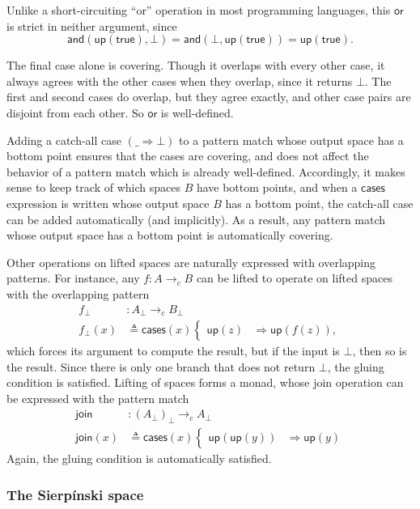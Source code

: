 \documentclass[conference]{IEEEtran}
\newcommand{\cto}{\to_c}
\newcommand{\wildcard}{\_}
\newcommand{\Branch}{\Rightarrow}
\newcommand{\up}{\mathsf{up}}
\begin{document}
Unlike a short-circuiting ``or'' operation in most programming languages, this $\mathsf{or}$ is strict in neither argument, since
\[ 
\mathsf{and}(\mathsf{up}(\mathsf{true}), \bot) = 
\mathsf{and}(\bot, \mathsf{up}(\mathsf{true})) =
\mathsf{up}(\mathsf{true}).
\]

The final case alone is covering. Though it overlaps with every other case, it always agrees with the other cases when they overlap, since it returns $\bot$. The first and second cases do overlap, but they agree exactly, and other case pairs are disjoint from each other. So $\mathsf{or}$ is well-defined.

Adding a catch-all case $(\wildcard \Branch \bot)$ to a pattern match whose output space has a bottom point ensures that the cases are covering, and does not affect the behavior of a pattern match which is already well-defined. Accordingly, it makes sense to keep track of which spaces $B$ have bottom points, and when a $\mathsf{cases}$ expression is written whose output space $B$ has a bottom point, the catch-all case can be added automatically (and implicitly). As a result, any pattern match whose output space has a bottom point is automatically covering.

Other operations on lifted spaces are naturally expressed with overlapping patterns. For instance, any $f : A \cto B$ can be lifted to operate on lifted spaces with the overlapping pattern
\begin{align*}
f_\bot &: A_\bot \cto B_\bot
\\ f_\bot(x) &\triangleq
  \mathsf{cases}(x)
  \begin{cases}
  \up(z) &\Branch \up(f(z)),
  \end{cases}
\end{align*}
which forces its argument to compute the result, but if the input is $\bot$, then so is the result. Since there is only one branch that does not return $\bot$, the gluing condition is satisfied. Lifting of spaces forms a monad, whose join operation can be expressed with the pattern match
\begin{align*}
\mathsf{join} &: \left( A_\bot \right)_\bot \cto A_\bot
\\ \mathsf{join}(x) &\triangleq \mathsf{cases}(x)
\begin{cases}
\up(\up(y)) &\Branch \up(y)
\end{cases}
\end{align*}
Again, the gluing condition is automatically satisfied.

\subsubsection{The Sierp\'inski space}
\end{document}
